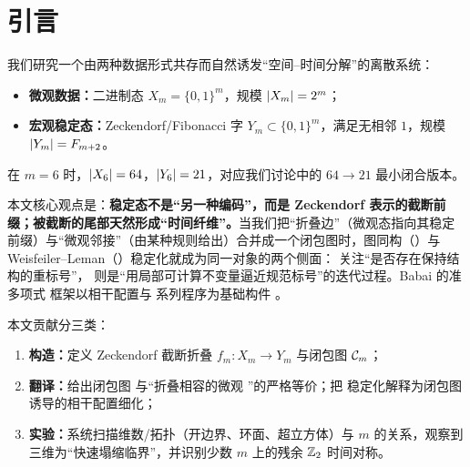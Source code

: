 
\section{引言}

我们研究一个由两种数据形式共存而自然诱发“空间--时间分解”的离散系统：
\begin{itemize}
  \item \textbf{微观数据：}二进制态 $X_m=\{0,1\}^{m}$，规模 $\left\lvert X_m\right\rvert=2^{m}$；
  \item \textbf{宏观稳定态：}Zeckendorf/Fibonacci 字 $Y_m\subset\{0,1\}^{m}$，满足无相邻 $1$，规模 $\left\lvert Y_m\right\rvert=F_{m+2}$。
\end{itemize}
在 $m=6$ 时，$\left\lvert X_6\right\rvert=64$，$\left\lvert Y_6\right\rvert=21$，对应我们讨论中的 $64\to 21$ 最小闭合版本。

本文核心观点是：\textbf{稳定态不是“另一种编码”，而是 Zeckendorf 表示的截断前缀；被截断的尾部天然形成“时间纤维”。}当我们把“折叠边”（微观态指向其稳定前缀）与“微观邻接”（由某种规则给出）合并成一个闭包图时，图同构（\GI{}）与 Weisfeiler--Leman（\WL{}）稳定化就成为同一对象的两个侧面：\GI{} 关注“是否存在保持结构的重标号”，\WL{} 则是“用局部可计算不变量逼近规范标号”的迭代过程。Babai 的准多项式 \GI{} 框架以相干配置与 \WL{} 系列程序为基础构件 \cite{babai2016gi}。

本文贡献分三类：
\begin{enumerate}
  \item \textbf{构造：}定义 Zeckendorf 截断折叠 $f_m:X_m\to Y_m$ 与闭包图 $\mathcal{C}_m$；
  \item \textbf{翻译：}给出闭包图 \GI{} 与“折叠相容的微观 \GI{}”的严格等价；把 \WL{} 稳定化解释为闭包图诱导的相干配置细化；
  \item \textbf{实验：}系统扫描维数/拓扑（开边界、环面、超立方体）与 $m$ 的关系，观察到三维为“快速塌缩临界”，并识别少数 $m$ 上的残余 $\mathbb{Z}_2$ 时间对称。
\end{enumerate}

